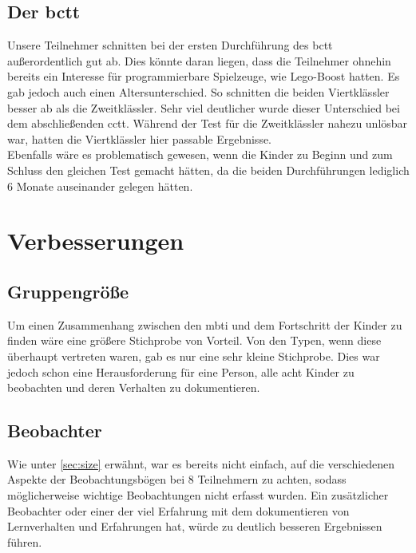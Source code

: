 \subsection*{Der \acrlong{bctt}} \label{sec:problemCTT}
Unsere Teilnehmer schnitten bei der ersten Durchführung des \acrshort{bctt} außerordentlich gut ab. Dies könnte daran liegen, dass die Teilnehmer ohnehin bereits ein Interesse für programmierbare Spielzeuge, wie \gls{Lego}-Boost hatten. Es gab jedoch auch einen Altersunterschied. So schnitten die beiden Viertklässler besser ab als die Zweitklässler. Sehr viel deutlicher wurde dieser Unterschied bei dem abschließenden \acrshort{cctt}. Während der Test für die Zweitklässler nahezu unlösbar war, hatten die Viertklässler hier passable Ergebnisse.\\
Ebenfalls wäre es problematisch gewesen, wenn die Kinder zu Beginn und zum Schluss den gleichen Test gemacht hätten, da die beiden Durchführungen lediglich 6 Monate auseinander gelegen hätten.


\section{Verbesserungen}
\subsection*{Gruppengröße}\label{sec:size}
Um einen Zusammenhang zwischen den \acrlong{mbti} und dem Fortschritt der Kinder zu finden wäre eine größere Stichprobe von Vorteil. Von den Typen, wenn diese überhaupt vertreten waren, gab es  nur eine sehr kleine Stichprobe. Dies war jedoch schon eine Herausforderung für eine Person, alle acht Kinder zu beobachten und deren Verhalten zu dokumentieren.

\subsection*{Beobachter}
Wie unter \ref{sec:size} erwähnt, war es bereits nicht einfach, auf die verschiedenen Aspekte der Beobachtungsbögen bei 8 Teilnehmern zu achten, sodass möglicherweise wichtige Beobachtungen nicht erfasst wurden. Ein zusätzlicher Beobachter oder einer der viel Erfahrung mit dem dokumentieren von Lernverhalten und Erfahrungen hat, würde zu deutlich besseren Ergebnissen führen.

